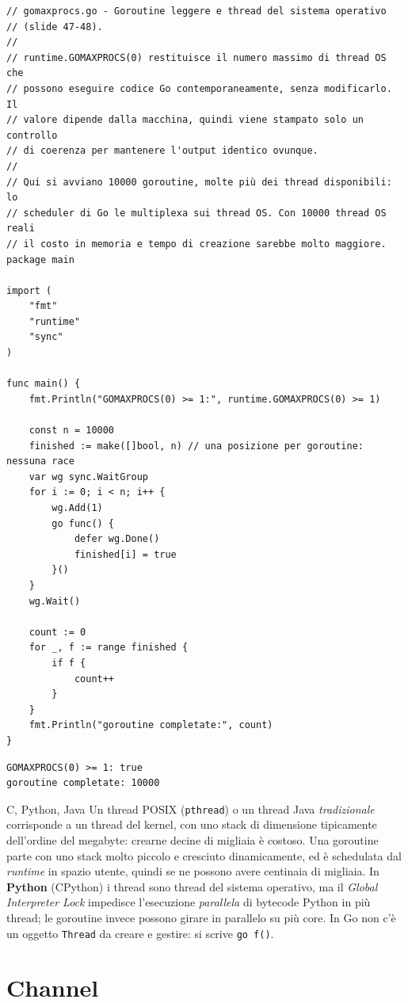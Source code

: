 \documentclass[11pt,a4paper]{report}
\newcommand{\cod}[1]{\texttt{#1}}
\begin{document}
\begin{lstlisting}[style=gocode,caption={\texttt{06\_concurrency/gomaxprocs.go}}]
// gomaxprocs.go - Goroutine leggere e thread del sistema operativo
// (slide 47-48).
//
// runtime.GOMAXPROCS(0) restituisce il numero massimo di thread OS che
// possono eseguire codice Go contemporaneamente, senza modificarlo. Il
// valore dipende dalla macchina, quindi viene stampato solo un controllo
// di coerenza per mantenere l'output identico ovunque.
//
// Qui si avviano 10000 goroutine, molte più dei thread disponibili: lo
// scheduler di Go le multiplexa sui thread OS. Con 10000 thread OS reali
// il costo in memoria e tempo di creazione sarebbe molto maggiore.
package main

import (
	"fmt"
	"runtime"
	"sync"
)

func main() {
	fmt.Println("GOMAXPROCS(0) >= 1:", runtime.GOMAXPROCS(0) >= 1)

	const n = 10000
	finished := make([]bool, n) // una posizione per goroutine: nessuna race
	var wg sync.WaitGroup
	for i := 0; i < n; i++ {
		wg.Add(1)
		go func() {
			defer wg.Done()
			finished[i] = true
		}()
	}
	wg.Wait()

	count := 0
	for _, f := range finished {
		if f {
			count++
		}
	}
	fmt.Println("goroutine completate:", count)
}
\end{lstlisting}
\begin{lstlisting}[style=output]
GOMAXPROCS(0) >= 1: true
goroutine completate: 10000
\end{lstlisting}

\begin{confronto}{C, Python, Java}
Un thread POSIX (\cod{pthread}) o un thread Java \emph{tradizionale} corrisponde
a un thread del kernel, con uno stack di dimensione tipicamente dell'ordine del
megabyte: crearne decine di migliaia è costoso. Una goroutine parte con uno
stack molto piccolo e cresciuto dinamicamente, ed è schedulata dal
\emph{runtime} in spazio utente, quindi se ne possono avere centinaia di migliaia.
In \textbf{Python} (CPython) i thread sono thread del sistema operativo, ma
il \emph{Global Interpreter Lock} impedisce l'esecuzione \emph{parallela} di
bytecode Python in più thread; le goroutine invece possono girare in parallelo
su più core. In Go non c'è un oggetto \cod{Thread} da creare e gestire: si
scrive \cod{go f()}.
\end{confronto}

\section{Channel}\label{sec:channel}
\end{document}
